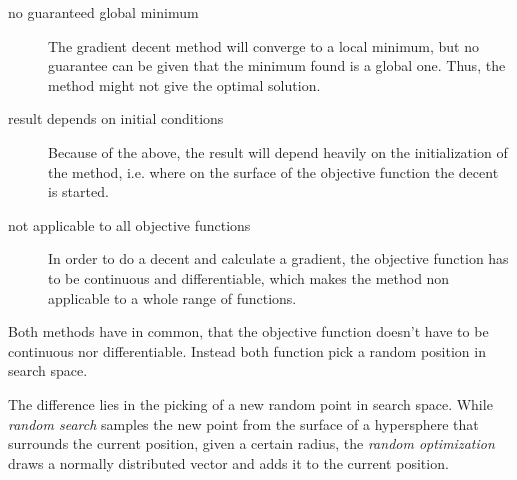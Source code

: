 \documentclass[10pt,a4paper,boxed]{hmcpset}
\begin{document}
\begin{problem}[Assignment 40]
\end{problem}
\begin{solution}
\begin{description}
	\item[no guaranteed global minimum] The gradient decent method will converge to a local minimum, but no guarantee can be given that the minimum found is a global one. Thus, the method might not give the optimal solution.
	\item[result depends on initial conditions] Because of the above, the result will depend heavily on the initialization of the method, i.e. where on the surface of the objective function the decent is started.
	\item[not applicable to all objective functions] In order to do a decent and calculate a gradient, the objective function has to be continuous and differentiable, which makes the method non applicable to a whole range of functions. 
\end{description}
\end{solution}


\begin{problem}[Assignment 41]
\end{problem}
\begin{solution}
Both methods have in common, that the objective function doesn't have to be continuous nor differentiable. Instead both function pick a random position in search space.

The difference lies in the picking of a new random point in search space. While \emph{random search} samples the new point from the surface of a hypersphere that surrounds the current position, given a certain radius, the \emph{random optimization} draws a normally distributed vector and adds it to the current position.
\end{solution}
\end{document}
